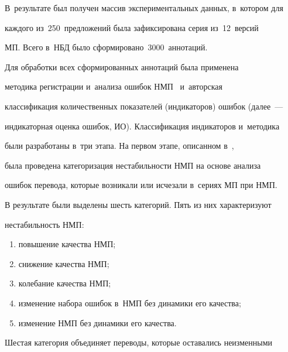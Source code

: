 В~результате был получен массив экспериментальных данных, в~котором для 


каж\-до\-го из~250~предложений была зафиксирована серия из~12~версий 


МП. Всего в~НБД было сформировано~3000~аннотаций.


   


  


   Для обработки всех сформированных аннотаций была применена 


методика регистрации и~анализа ошибок НМП~\cite{6-ez} и~авторская 


классификация количественных показателей (индикаторов) ошибок (далее~--- 


индикаторная оценка ошибок, ИО). Классификация индикаторов и~методика 


были разработаны в~три этапа. На первом этапе, описанном в~\cite{16-ez}, 


была проведена категоризация нестабильности НМП на основе анализа 


ошибок перевода, которые возникали или исчезали в~сериях МП при НМП.


   


   В результате были выделены шесть категорий. Пять из них характеризуют 


не\-ста\-биль\-ность НМП: 


\begin{enumerate}[(1)]


\item %


повышение качества НМП; 


\item %


снижение качества  НМП; 


\item %


колебание качества НМП; 


\item %


изменение набора ошибок в~НМП без  динамики его качества; 


\item %


изменение НМП без динамики его качества. 


\end{enumerate}


Шестая категория объединяет переводы, которые оставались неизменными 


